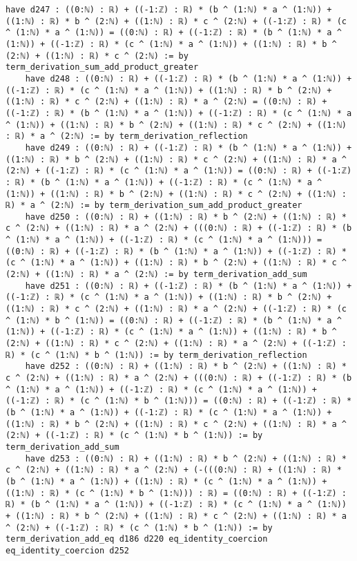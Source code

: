 \documentclass{article}
\begin{document}
\begin{tcolorbox}[colback=white!10, width=\linewidth]
\begin{lstlisting}[language=Lean4]
    have d247 : ((0:ℕ) : ℝ) + ((-1:ℤ) : ℝ) * (b ^ (1:ℕ) * a ^ (1:ℕ)) + ((1:ℕ) : ℝ) * b ^ (2:ℕ) + ((1:ℕ) : ℝ) * c ^ (2:ℕ) + ((-1:ℤ) : ℝ) * (c ^ (1:ℕ) * a ^ (1:ℕ)) = ((0:ℕ) : ℝ) + ((-1:ℤ) : ℝ) * (b ^ (1:ℕ) * a ^ (1:ℕ)) + ((-1:ℤ) : ℝ) * (c ^ (1:ℕ) * a ^ (1:ℕ)) + ((1:ℕ) : ℝ) * b ^ (2:ℕ) + ((1:ℕ) : ℝ) * c ^ (2:ℕ) := by term_derivation_sum_add_product_greater
    have d248 : ((0:ℕ) : ℝ) + ((-1:ℤ) : ℝ) * (b ^ (1:ℕ) * a ^ (1:ℕ)) + ((-1:ℤ) : ℝ) * (c ^ (1:ℕ) * a ^ (1:ℕ)) + ((1:ℕ) : ℝ) * b ^ (2:ℕ) + ((1:ℕ) : ℝ) * c ^ (2:ℕ) + ((1:ℕ) : ℝ) * a ^ (2:ℕ) = ((0:ℕ) : ℝ) + ((-1:ℤ) : ℝ) * (b ^ (1:ℕ) * a ^ (1:ℕ)) + ((-1:ℤ) : ℝ) * (c ^ (1:ℕ) * a ^ (1:ℕ)) + ((1:ℕ) : ℝ) * b ^ (2:ℕ) + ((1:ℕ) : ℝ) * c ^ (2:ℕ) + ((1:ℕ) : ℝ) * a ^ (2:ℕ) := by term_derivation_reflection
    have d249 : ((0:ℕ) : ℝ) + ((-1:ℤ) : ℝ) * (b ^ (1:ℕ) * a ^ (1:ℕ)) + ((1:ℕ) : ℝ) * b ^ (2:ℕ) + ((1:ℕ) : ℝ) * c ^ (2:ℕ) + ((1:ℕ) : ℝ) * a ^ (2:ℕ) + ((-1:ℤ) : ℝ) * (c ^ (1:ℕ) * a ^ (1:ℕ)) = ((0:ℕ) : ℝ) + ((-1:ℤ) : ℝ) * (b ^ (1:ℕ) * a ^ (1:ℕ)) + ((-1:ℤ) : ℝ) * (c ^ (1:ℕ) * a ^ (1:ℕ)) + ((1:ℕ) : ℝ) * b ^ (2:ℕ) + ((1:ℕ) : ℝ) * c ^ (2:ℕ) + ((1:ℕ) : ℝ) * a ^ (2:ℕ) := by term_derivation_sum_add_product_greater
    have d250 : ((0:ℕ) : ℝ) + ((1:ℕ) : ℝ) * b ^ (2:ℕ) + ((1:ℕ) : ℝ) * c ^ (2:ℕ) + ((1:ℕ) : ℝ) * a ^ (2:ℕ) + (((0:ℕ) : ℝ) + ((-1:ℤ) : ℝ) * (b ^ (1:ℕ) * a ^ (1:ℕ)) + ((-1:ℤ) : ℝ) * (c ^ (1:ℕ) * a ^ (1:ℕ))) = ((0:ℕ) : ℝ) + ((-1:ℤ) : ℝ) * (b ^ (1:ℕ) * a ^ (1:ℕ)) + ((-1:ℤ) : ℝ) * (c ^ (1:ℕ) * a ^ (1:ℕ)) + ((1:ℕ) : ℝ) * b ^ (2:ℕ) + ((1:ℕ) : ℝ) * c ^ (2:ℕ) + ((1:ℕ) : ℝ) * a ^ (2:ℕ) := by term_derivation_add_sum
    have d251 : ((0:ℕ) : ℝ) + ((-1:ℤ) : ℝ) * (b ^ (1:ℕ) * a ^ (1:ℕ)) + ((-1:ℤ) : ℝ) * (c ^ (1:ℕ) * a ^ (1:ℕ)) + ((1:ℕ) : ℝ) * b ^ (2:ℕ) + ((1:ℕ) : ℝ) * c ^ (2:ℕ) + ((1:ℕ) : ℝ) * a ^ (2:ℕ) + ((-1:ℤ) : ℝ) * (c ^ (1:ℕ) * b ^ (1:ℕ)) = ((0:ℕ) : ℝ) + ((-1:ℤ) : ℝ) * (b ^ (1:ℕ) * a ^ (1:ℕ)) + ((-1:ℤ) : ℝ) * (c ^ (1:ℕ) * a ^ (1:ℕ)) + ((1:ℕ) : ℝ) * b ^ (2:ℕ) + ((1:ℕ) : ℝ) * c ^ (2:ℕ) + ((1:ℕ) : ℝ) * a ^ (2:ℕ) + ((-1:ℤ) : ℝ) * (c ^ (1:ℕ) * b ^ (1:ℕ)) := by term_derivation_reflection
    have d252 : ((0:ℕ) : ℝ) + ((1:ℕ) : ℝ) * b ^ (2:ℕ) + ((1:ℕ) : ℝ) * c ^ (2:ℕ) + ((1:ℕ) : ℝ) * a ^ (2:ℕ) + (((0:ℕ) : ℝ) + ((-1:ℤ) : ℝ) * (b ^ (1:ℕ) * a ^ (1:ℕ)) + ((-1:ℤ) : ℝ) * (c ^ (1:ℕ) * a ^ (1:ℕ)) + ((-1:ℤ) : ℝ) * (c ^ (1:ℕ) * b ^ (1:ℕ))) = ((0:ℕ) : ℝ) + ((-1:ℤ) : ℝ) * (b ^ (1:ℕ) * a ^ (1:ℕ)) + ((-1:ℤ) : ℝ) * (c ^ (1:ℕ) * a ^ (1:ℕ)) + ((1:ℕ) : ℝ) * b ^ (2:ℕ) + ((1:ℕ) : ℝ) * c ^ (2:ℕ) + ((1:ℕ) : ℝ) * a ^ (2:ℕ) + ((-1:ℤ) : ℝ) * (c ^ (1:ℕ) * b ^ (1:ℕ)) := by term_derivation_add_sum
    have d253 : ((0:ℕ) : ℝ) + ((1:ℕ) : ℝ) * b ^ (2:ℕ) + ((1:ℕ) : ℝ) * c ^ (2:ℕ) + ((1:ℕ) : ℝ) * a ^ (2:ℕ) + (-(((0:ℕ) : ℝ) + ((1:ℕ) : ℝ) * (b ^ (1:ℕ) * a ^ (1:ℕ)) + ((1:ℕ) : ℝ) * (c ^ (1:ℕ) * a ^ (1:ℕ)) + ((1:ℕ) : ℝ) * (c ^ (1:ℕ) * b ^ (1:ℕ))) : ℝ) = ((0:ℕ) : ℝ) + ((-1:ℤ) : ℝ) * (b ^ (1:ℕ) * a ^ (1:ℕ)) + ((-1:ℤ) : ℝ) * (c ^ (1:ℕ) * a ^ (1:ℕ)) + ((1:ℕ) : ℝ) * b ^ (2:ℕ) + ((1:ℕ) : ℝ) * c ^ (2:ℕ) + ((1:ℕ) : ℝ) * a ^ (2:ℕ) + ((-1:ℤ) : ℝ) * (c ^ (1:ℕ) * b ^ (1:ℕ)) := by term_derivation_add_eq d186 d220 eq_identity_coercion eq_identity_coercion d252

\end{lstlisting}
\end{tcolorbox}
\end{document}
